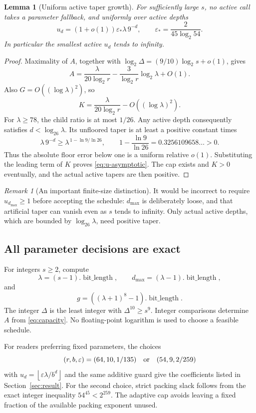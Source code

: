 \documentclass[11pt,letterpaper]{article}
\numberwithin{equation}{section}
\newtheorem{lemma}[theorem]{Lemma}
\theoremstyle{definition}\newtheorem{definition}[theorem]{Definition}
\theoremstyle{remark}\newtheorem{remark}[theorem]{Remark}
\newcommand{\floor}[1]{\left\lfloor #1\right\rfloor}
\begin{document}
\begin{lemma}[Uniform active taper growth]\label{lem:taper-growth}
For sufficiently large $s$, no active call takes a parameter fallback,
and uniformly over active depths
\begin{equation}
 u_d=(1+o(1))\varepsilon_*\lambda\,9^{-d},
 \qquad
 \varepsilon_*=\frac2{45\log_2 54}.
 \label{eq:u-asymptotic}
\end{equation}
In particular the smallest active $u_d$ tends to infinity.
\end{lemma}
\begin{proof}
Maximality of $A$, together with
$\log_2\Delta=(9/10)\log_2s+o(1)$, gives
\[
 A=\frac{\lambda}{20\log_2r}
   -\frac3{\log_2r}\log_2\lambda+O(1).
\]
Also $G=O((\log\lambda)^2)$, so
\[
 K=\frac{\lambda}{20\log_2r}-O((\log\lambda)^2).
\]
For $\lambda\ge78$, the child ratio is at most $1/26$. Any active
depth consequently satisfies $d<\log_{26}\lambda$. Its unfloored taper
is at least a positive constant times
\[
 \lambda\,9^{-d}
 \ge \lambda^{\,1-\ln9/\ln26},
 \qquad 1-\frac{\ln9}{\ln26}=0.3256109658\ldots>0.
\]
Thus the absolute floor error below one is a uniform relative $o(1)$.
Substituting the leading term of $K$ proves \eqref{eq:u-asymptotic}.
The cap exists and $K>0$ eventually, and the actual active tapers are
then positive.
\end{proof}

\begin{remark}[An important finite-size distinction]
It would be incorrect to require $u_{d_{\max}}\ge1$ before accepting
the schedule: $d_{\max}$ is deliberately loose, and that artificial
taper can vanish even as $s$ tends to infinity. Only actual active
depths, which are bounded by $\log_{26}\lambda$, need positive taper.
\end{remark}

\subsection{All parameter decisions are exact}

For integers $s\ge2$, compute
\[
 \lambda=(s-1).\operatorname{bit\_length},\qquad
 d_{\max}=(\lambda-1).\operatorname{bit\_length},
\]
and
\[
 g=((\lambda+1)^8-1).\operatorname{bit\_length}.
\]
The integer $\Delta$ is the least integer with $\Delta^{10}\ge s^9$.
Integer comparisons determine $A$ from \eqref{eq:capacity}.
No floating-point logarithm is used to choose a feasible schedule.

For readers preferring fixed parameters, the choices
\[
 (r,b,\varepsilon)=(64,10,1/135)
 \quad\hbox{or}\quad(54,9,2/259)
\]
with $u_d=\floor{\varepsilon\lambda/b^d}$ and the same additive guard
give the coefficients listed in Section~\ref{sec:result}.
For the second choice, strict packing slack follows from the exact
integer inequality $54^{45}<2^{259}$. The adaptive cap avoids leaving
a fixed fraction of the available packing exponent unused.
\end{document}
